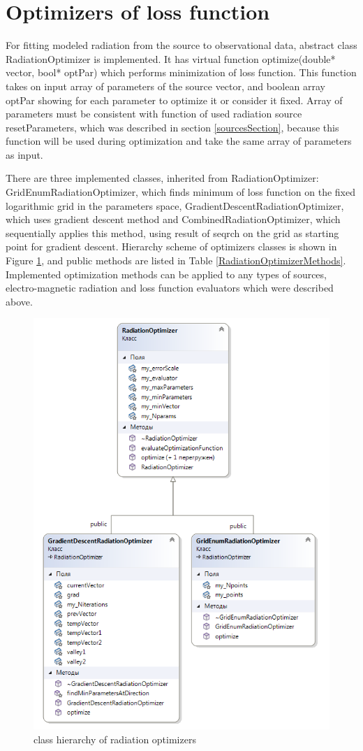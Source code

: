 \section{Optimizers of loss function}

For fitting modeled radiation from the source to observational data, abstract class RadiationOptimizer is implemented. It has virtual function optimize(double* vector, bool* optPar) which performs minimization of loss function. This function takes on input array of parameters of the source vector, and boolean array optPar showing for each parameter to optimize it or consider it fixed. Array of parameters must be consistent with function of used radiation source resetParameters, which was described in section \ref{sourcesSection}, because this function will be used during optimization and take the same array of parameters as input.

There are three implemented classes, inherited from RadiationOptimizer: GridEnumRadiationOptimizer, which finds minimum of loss function on the fixed logarithmic grid in the parameters space, GradientDescentRadiationOptimizer, which uses gradient descent method and CombinedRadiationOptimizer, which sequentially applies this method, using result of seqrch on the grid as starting point for gradient descent. Hierarchy scheme of optimizers classes is shown in Figure \ref{radiationOptimizer}, and public methods are listed in Table \ref{RadiationOptimizerMethods}. Implemented optimization methods can be applied to any types of sources, electro-magnetic radiation and loss function evaluators which were described above.
\begin{figure}
	\centering
	\includegraphics[width=11.5 cm]{./fig/radiationOptimizer.png} 
	\caption{class hierarchy of radiation optimizers}
	\label{radiationOptimizer}
\end{figure}

